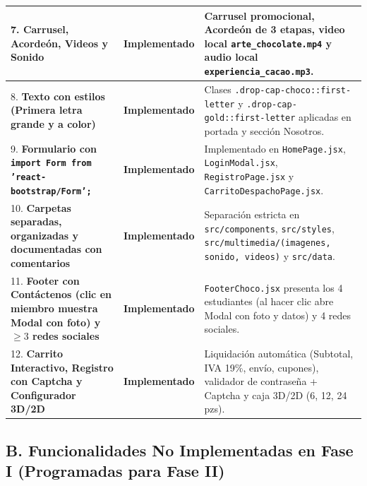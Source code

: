 \documentclass[12pt,letterpaper]{article}
\begin{document}
\begin{longtable}{p{} p{} p{}}
\midrule
7. \textbf{Carrusel, Acordeón, Videos y Sonido} & \textcolor{verdexito}{\textbf{Implementado}} & Carrusel promocional, Acordeón de 3 etapas, video local \texttt{arte\_chocolate.mp4} y audio local \texttt{experiencia\_cacao.mp3}. \\
\midrule
8. \textbf{Texto con estilos (Primera letra grande y a color)} & \textcolor{verdexito}{\textbf{Implementado}} & Clases \texttt{.drop-cap-choco::first-letter} y \texttt{.drop-cap-gold::first-letter} aplicadas en portada y sección Nosotros. \\
\midrule
9. \textbf{Formulario con \texttt{import Form from 'react-bootstrap/Form';}} & \textcolor{verdexito}{\textbf{Implementado}} & Implementado en \texttt{HomePage.jsx}, \texttt{LoginModal.jsx}, \texttt{RegistroPage.jsx} y \texttt{CarritoDespachoPage.jsx}. \\
\midrule
10. \textbf{Carpetas separadas, organizadas y documentadas con comentarios} & \textcolor{verdexito}{\textbf{Implementado}} & Separación estricta en \texttt{src/components}, \texttt{src/styles}, \texttt{src/multimedia/(imagenes, sonido, videos)} y \texttt{src/data}. \\
\midrule
11. \textbf{Footer con Contáctenos (clic en miembro muestra Modal con foto) y $\ge 3$ redes sociales} & \textcolor{verdexito}{\textbf{Implementado}} & \texttt{FooterChoco.jsx} presenta los 4 estudiantes (al hacer clic abre Modal con foto y datos) y 4 redes sociales. \\
\midrule
12. \textbf{Carrito Interactivo, Registro con Captcha y Configurador 3D/2D} & \textcolor{verdexito}{\textbf{Implementado}} & Liquidación automática (Subtotal, IVA 19\%, envío, cupones), validador de contraseña + Captcha y caja 3D/2D (6, 12, 24 pzs). \\
\bottomrule
\end{longtable}

\subsection*{B. Funcionalidades No Implementadas en Fase I (Programadas para Fase II)}
\end{document}
